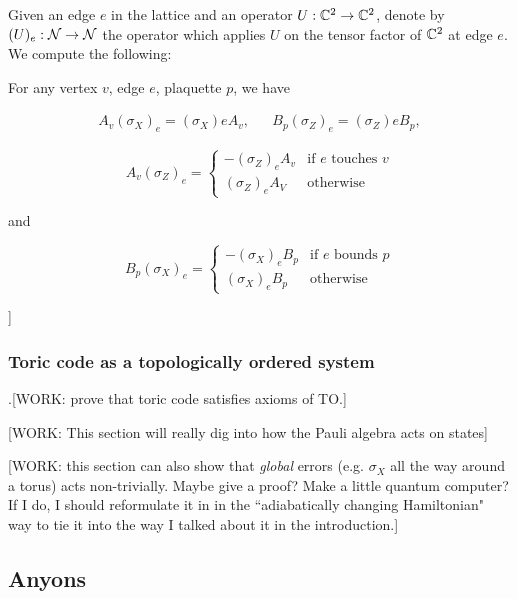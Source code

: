 Given an edge $e$ in the lattice and an operator $U:\mathbb{C}^2\to \mathbb{C}^2$, denote by $(U)_e:\mathcal{N}\to\mathcal{N}$ the operator which applies $U$ on the tensor factor of $\mathbb{C}^2$ at edge $e$. We compute the following:

\begin{lemma} For any vertex $v$, edge $e$, plaquette $p$, we have

\begin{align*}
A_v  (\sigma_X)_e=(\sigma_X)e A_v, && B_p (\sigma_Z)_e=(\sigma_Z)e B_p,
\end{align*}

\begin{equation*}
A_v (\sigma_Z)_e=
\begin{cases}
- (\sigma_Z)_e A_v & \text{if $e$ touches $v$}\\
(\sigma_Z)_e A_V & \text{otherwise}
\end{cases}
\end{equation*}

and

\begin{equation*}
B_p (\sigma_X)_e=
\begin{cases}
- (\sigma_X)_e B_p & \text{if $e$ bounds $p$}\\
(\sigma_X)_e B_p & \text{otherwise}
\end{cases}
\end{equation*}


\end{lemma}

]

\subsubsection{Toric code as a topologically ordered system}

.[WORK: prove that toric code satisfies axioms of TO.]

[WORK: This section will really dig into how the Pauli algebra acts on states]

[WORK: this section can also show that \textit{global} errors (e.g. $\sigma_X$ all the way around a torus) acts non-trivially. Maybe give a proof? Make a little quantum computer? If I do, I should reformulate it in in the ``adiabatically changing Hamiltonian" way to tie it into the way I talked about it in the introduction.]



\subsection{Anyons}

